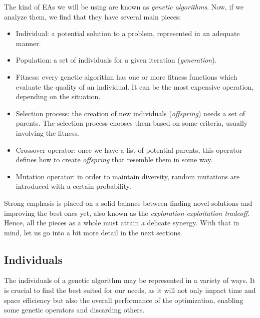 \newpage

	The kind of \acs{EA}s we will be using are known as \textit{genetic algorithms}. Now, if we analyze them, we find that they have several main pieces:

	\begin{itemize}

		\item
		Individual: a potential solution to a problem, represented in an adequate manner.

		\item
		Population: a set of individuals for a given iteration (\textit{generation}).

		\item
		Fitness: every genetic algorithm has one or more fitness functions which evaluate the quality of an individual. It can be the most expensive operation, depending on the situation.

		\item
		Selection process: the creation of new individuals (\textit{offspring}) needs a set of parents. The selection process chooses them based on some criteria, usually involving the fitness.

		\item
		Crossover operator: once we have a list of potential parents, this operator defines how to create \textit{offspring} that resemble them in some way.

		\item
		Mutation operator: in order to maintain diversity, random mutations are introduced with a certain probability.

	\end{itemize}

	Strong emphasis is placed on a solid balance between finding novel solutions and improving the best ones yet, also known as the \textit{exploration-exploitation tradeoff}. Hence, all the pieces as a whole must attain a delicate synergy. With that in mind, let us go into a bit more detail in the next sections.

	\subsection{Individuals}

		The individuals of a genetic algorithm may be represented in a variety of ways. It is crucial to find the best suited for our needs, as it will not only impact time and space efficiency but also the overall performance of the optimization, enabling some genetic operators and discarding others.

